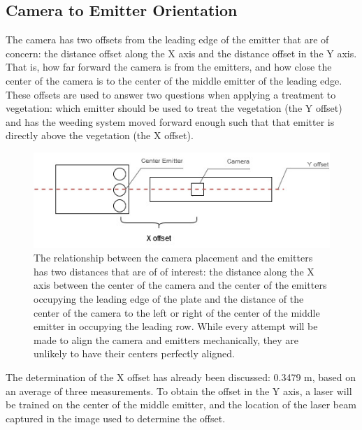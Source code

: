 \documentclass[12pt]{article}
\begin{document}
\subsection{Camera to Emitter Orientation}
The camera has two offsets from the leading edge of the emitter that are of concern: the distance offset along the X axis and the distance offset in the Y axis. That is, how far forward the camera is from the emitters, and how close the center of the camera is to the center of the middle emitter of the leading edge. These offsets are used to answer two questions when applying a treatment to vegetation: which emitter should be used to treat the vegetation (the Y offset) and has the weeding system moved forward enough such that that emitter is directly above the vegetation (the X offset).

\begin{figure}[H]
	\centering
	\includegraphics[width=0.75\linewidth]{./figures/camera-to-emitter-relationship.jpg}
	\caption[Determine relationship between camera and emitter]{The relationship between the camera placement and the emitters has two distances that are of of interest: the distance along the X axis between the center of the camera and the center of the emitters occupying the leading edge of the plate and the distance of the center of the camera to the left or right of the center of the middle emitter in occupying the leading row. While every attempt will be made to align the camera and emitters mechanically, they are unlikely to have their centers perfectly aligned.}
	\label{fig:camera-to-emitter-relationship}
\end{figure}

The determination of the X offset has already been discussed: 0.3479 m, based on an average of three measurements. To obtain the offset in the Y  axis, a laser will be trained on the center of the middle emitter, and the location of the laser beam captured in the image used to determine the offset.
\end{document}
